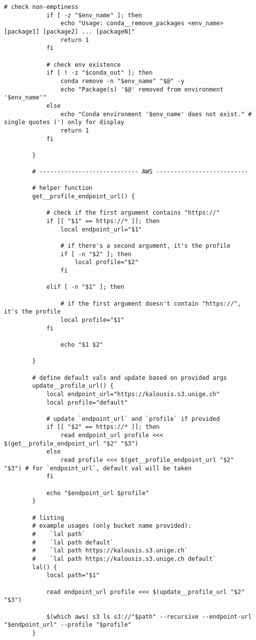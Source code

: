 \documentclass[12pt, a4paper]{article}
\numberwithin{equation}{section}
\theoremstyle{definition}
\theoremstyle{definition}
\begin{document}
\begin{lstlisting}[style=mystylebash, label=alg:bashrc_contents, xleftmargin=\parindent]
			# check non-emptiness
			if [ -z "$env_name" ]; then
				echo "Usage: conda__remove_packages <env_name> [package1] [package2] ... [packageN]"
				return 1
			fi 
			
			# check env existence
			if [ ! -z "$conda_out" ]; then
				conda remove -n "$env_name" "$@" -y
				echo "Package(s) '$@' removed from environment '$env_name'"
			else
				echo "Conda environment '$env_name' does not exist." # single quotes (') only for display
				return 1	
			fi
			
		}
	
		# ---------------------------- AWS --------------------------
		
		# helper function
		get__profile_endpoint_url() {
			
			# check if the first argument contains "https://"                                       
			if [[ "$1" == https://* ]]; then
				local endpoint_url="$1"
			
				# if there's a second argument, it's the profile
				if [ -n "$2" ]; then
					local profile="$2"
				fi
			
			elif [ -n "$1" ]; then
			
				# if the first argument doesn't contain "https://", it's the profile
				local profile="$1"
			fi
				
				echo "$1 $2"
			
		}
		
		# define default vals and update based on provided args
		update__profile_url() {
			local endpoint_url="https://kalousis.s3.unige.ch"
			local profile="default"
			
			# update `endpoint_url` and `profile` if provided
			if [[ "$2" == https://* ]]; then
				read endpoint_url profile <<< $(get__profile_endpoint_url "$2" "$3")
			else 
				read profile <<< $(get__profile_endpoint_url "$2" "$3") # for `endpoint_url`, default val will be taken
			fi
			
			echo "$endpoint_url $profile"
		}
		
		# listing
		# example usages (only bucket name provided):
		#    `lal path`
		#    `lal path default`
		#    `lal path https://kalousis.s3.unige.ch`
		#    `lal path https://kalousis.s3.unige.ch default`
		lal() {
			local path="$1"
			
			read endpoint_url profile <<< $(update__profile_url "$2" "$3")
			
			$(which aws) s3 ls s3://"$path" --recursive --endpoint-url "$endpoint_url" --profile "$profile"
		}
		

\end{lstlisting}
\end{document}
